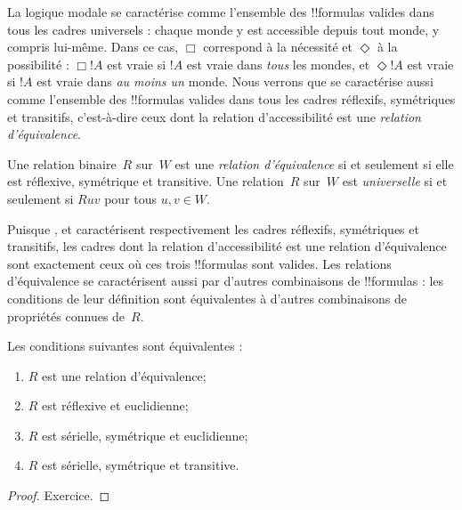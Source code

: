 \documentclass[../../../include/open-logic-section]{subfiles}
\begin{document}


La logique modale  se caractérise comme l'ensemble des
!!{formula}s valides dans tous les cadres universels : chaque monde y
est accessible depuis tout monde, y compris lui-même. Dans ce cas,
$\Box$ correspond à la nécessité et $\Diamond$ à la possibilité :
$\Box !A$ est vraie si $!A$ est vraie dans \emph{tous} les mondes, et
$\Diamond !A$ est vraie si $!A$ est vraie dans \emph{au moins un} monde.
Nous verrons que  se caractérise aussi comme l'ensemble des
!!{formula}s valides dans tous les cadres réflexifs, symétriques et
transitifs, c'est-à-dire ceux dont la relation d'accessibilité est
une \emph{relation d'équivalence}.

\begin{defn}
  Une relation binaire~$R$ sur~$W$ est une \emph{relation
  d'équivalence} si et seulement si elle est réflexive, symétrique et
  transitive. Une relation~$R$ sur~$W$ est \emph{universelle} si et
  seulement si $Ruv$ pour tous $u,v \in W$.
\end{defn}

Puisque ,  et  caractérisent respectivement les
cadres réflexifs, symétriques et transitifs, les cadres dont la
relation d'accessibilité est une relation d'équivalence sont
exactement ceux où ces trois !!{formula}s sont valides. Les relations
d'équivalence se caractérisent aussi par d'autres combinaisons de
!!{formula}s : les conditions de leur définition sont équivalentes à
d'autres combinaisons de propriétés connues de~$R$.

\begin{prop}
  Les conditions suivantes sont équivalentes :
  \begin{enumerate}
  \item $R$ est une relation d'équivalence;
  \item $R$ est réflexive et euclidienne;
  \item $R$ est sérielle, symétrique et euclidienne;
  \item $R$ est sérielle, symétrique et transitive.
  \end{enumerate}
\end{prop}

\begin{proof}
  Exercice.
\end{proof}
\end{document}
